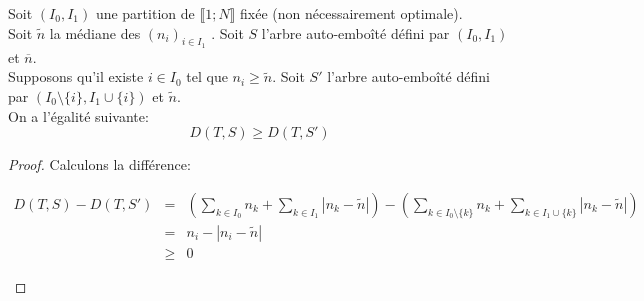 \begin{lem}
  \label{lem3}
  Soit $(I_{0}, I_{1})$ une partition de $\llbracket 1;N \rrbracket$
  fixée (non nécessairement optimale).\\
  Soit $\tilde{n}$ la médiane des $(n_{i})_{i \in I_{1}}$ .
  Soit $S$ l'arbre auto-emboîté défini par $(I_{0}, I_{1})$ et $\overline{n}$.\\
  Supposons qu'il existe $i \in I_{0}$ tel que $n_{i} \geqslant
  \tilde{n}$.
  Soit $S'$ l'arbre auto-emboîté défini par $(I_{0} \setminus \{i\},
  I_{1} \cup \{i\})$ et $\tilde{n}$.\\
  On a l'égalité suivante: $$D(T,S) \geqslant D(T,S')$$
  \begin{proof}
    Calculons la différence:
    \begin{center}
      $
      \begin{array}{rcl}
        D(T,S) - D(T,S') &=& \left( \sum_{k \in I_{0}} n_{k} + \sum_{k \in
                            I_{1}} |n_{k} - \tilde{n}| \right) -\left( \sum_{k \in
                            I_{0}\setminus \{k\}} n_{k} + \sum_{k \in
                            I_{1} \cup \{k\}} |n_{k} - \tilde{n}| \right)\\
                        &=& n_{i} - |n_{i} - \tilde{n}|\\
                        & \geqslant & 0
      \end{array}
      $
    \end{center}
    
  \end{proof}
\end{lem}

